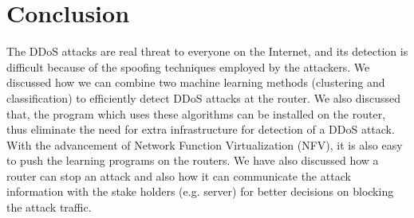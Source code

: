 \documentclass[12pt,oneside,a4paper]{article}
\begin{document}
\pagebreak
\section{Conclusion}

The DDoS attacks are real threat to everyone on the Internet, and its detection is difficult because of the spoofing techniques employed by the attackers. We discussed how we can combine two machine learning methods (clustering and classification) to efficiently detect DDoS attacks at the router. We also discussed that, the program which uses these algorithms can be installed on the router, thus eliminate the need for extra infrastructure for detection of a DDoS attack. With the advancement of Network Function Virtualization (NFV), it is also easy to push the learning programs on the routers. We have also discussed how a router can stop an attack and also how it can communicate the attack information with the stake holders (e.g. server) for better decisions on blocking the attack traffic.

\pagebreak

\singlespacing
\end{document}
